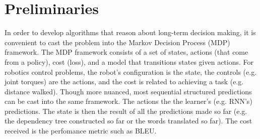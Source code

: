 \documentclass{article}
\newcommand{\BB}[1]{\textcolor{red}{\bf Byron: {#1}}}
\newcommand{\drew}[1]{\textcolor{blue}{\bf Drew: {#1}}}
\begin{document}

\section{Preliminaries}
In order to develop algorithms that reason about long-term decision making, it is convenient to cast the problem into the Markov Decision Process (MDP) framework. The MDP framework consists of a set of states, actions (that come from a policy), cost (loss), and a model that transitions states given actions. For robotics control problems, the robot's configuration is the state, the controls (e.g. joint torques) are the actions, and the cost is related to achieving a task (e.g. distance walked). Though more nuanced, most sequential structured predictions can be cast into the same framework. The actions the the learner's (e.g. RNN's) predictions. The state is then the result of all the predictions made so far (e.g. the dependency tree constructed so far or the words translated so far). The cost received is the perfomance metric such as BLEU.
\end{document}
